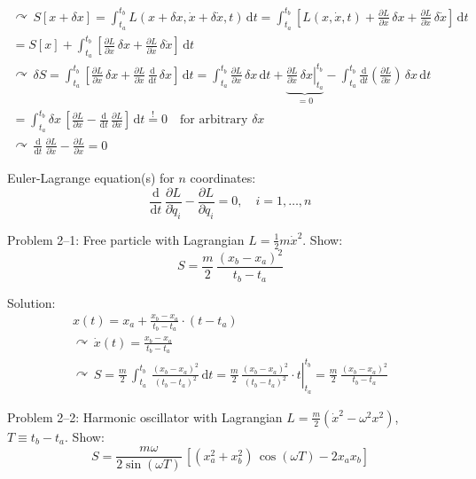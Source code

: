 \documentclass[fontsize=11pt,a4paper]{scrartcl}
\begin{document}
\begin{gather*}
	\curvearrowright\, S[x+\delta x]=\int_{t_a}^{t_b} L(x+\delta x,\dot x+\delta\dot x,t)\,\mathrm{d}t=\int_{t_a}^{t_b} \left[L(x,\dot x,t)+\frac{\partial L}{\partial x}\,\delta x+\frac{\partial L}{\partial \dot x}\,\delta\dot x\right]\,\mathrm{d}t\\
	=S[x]+\int_{t_a}^{t_b} \left[\frac{\partial L}{\partial x}\,\delta x+\frac{\partial L}{\partial\dot x}\,\delta\dot x\right]\,\mathrm{d}t\\
	\curvearrowright\,\delta S=\int_{t_a}^{t_b} \left[\frac{\partial L}{\partial x}\,\delta x+\frac{\partial L}{\partial\dot x}\,\frac{\mathrm{d}}{\mathrm{d}t}\,\delta x\right]\,\mathrm{d}t=\int_{t_a}^{t_b} \frac{\partial L}{\partial x}\,\delta x\,\mathrm{d}t+\underbrace{\left.\frac{\partial L}{\partial\dot x}\,\delta x\right|_{t_a}^{t_b}}_{=0}-\int_{t_a}^{t_b} \frac{\mathrm{d}}{\mathrm{d}t}\left(\frac{\partial L}{\partial\dot x}\right)\,\delta x\,\mathrm{d}t\\
	=\int_{t_a}^{t_b}\delta x\,\left[\frac{\partial L}{\partial x}-\frac{\mathrm{d}}{\mathrm{d}t}\,\frac{\partial L}{\partial \dot x}\right]\,\mathrm{d}t\stackrel{!}{=}0\quad\text{for arbitrary }\delta x\\
	\curvearrowright\,\frac{\mathrm{d}}{\mathrm{d}t}\,\frac{\partial L}{\partial\dot x}-\frac{\partial L}{\partial x}=0
\end{gather*}

Euler-Lagrange equation(s) for $n$ coordinates:
\[
	\frac{\mathrm{d}}{\mathrm{d}t}\,\frac{\partial L}{\partial \dot q_i}-\frac{\partial L}{\partial q_i}=0,\quad i=1,\dots,n
\]

Problem 2--1: Free particle with Lagrangian $L=\frac{1}{2}m\dot x^2$. Show:
\[
	S=\frac{m}{2}\,\frac{(x_b-x_a)^2}{t_b-t_a}
\]

Solution:
\begin{gather*}
	x(t)=x_a+\frac{x_b-x_a}{t_b-t_a}\cdot (t-t_a)\\
	\curvearrowright\,\dot x(t)=\frac{x_b-x_a}{t_b-t_a}\\
	\curvearrowright\,S=\frac{m}{2}\,\int_{t_a}^{t_b}\,\frac{(x_b-x_a)^2}{(t_b-t_a)^2}\,\mathrm{d}t=\frac{m}{2}\,\left.\frac{(x_b-x_a)^2}{(t_b-t_a)^2}\cdot t\right|_{t_a}^{t_b}=\frac{m}{2}\,\frac{(x_b-x_a)^2}{t_b-t_a}
\end{gather*}

Problem 2--2: Harmonic oscillator with Lagrangian $L=\frac{m}{2}(\dot x^2-\omega^2 x^2)$, $T\equiv t_b-t_a$. Show:
\[
	S=\frac{m\omega}{2\sin(\omega T)}\,\left[(x_a^2+x_b^2)\,\cos(\omega T)-2x_a x_b\right]
\]
\end{document}
